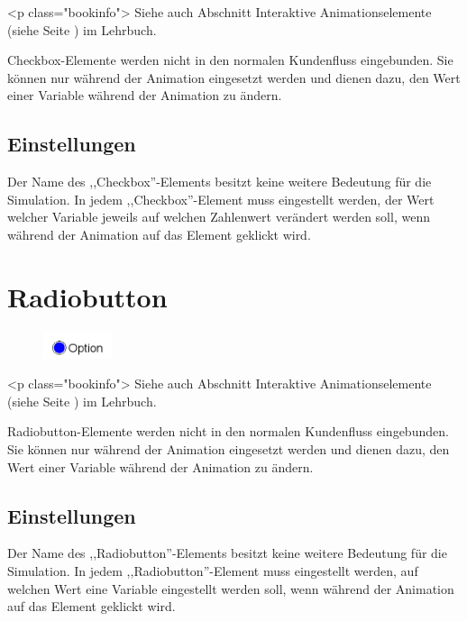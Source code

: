 <p class="bookinfo">
Siehe auch Abschnitt Interaktive Animationselemente (siehe Seite \pageref{ref:book:8.12.4}) im Lehrbuch.

Checkbox-Elemente werden nicht in den normalen Kundenfluss eingebunden.
Sie können nur während der Animation eingesetzt werden und dienen dazu,
den Wert einer Variable während der Animation zu ändern.

\subsection*{Einstellungen}

Der Name des ,,Checkbox''-Elements besitzt keine weitere Bedeutung für die Simulation.
In jedem ,,Checkbox''-Element muss eingestellt werden, der Wert welcher Variable
jeweils auf welchen Zahlenwert verändert werden soll, wenn während der Animation
auf das Element geklickt wird.


\section{Radiobutton}
\label{ref:ModelElementInteractiveRadiobutton}

\begin{figure}
\vspace{-22pt}
\includegraphics[width=2cm]{imageModelElementInteractiveRadiobutton.png}
\vspace{-22pt}
\end{figure}

<p class="bookinfo">
Siehe auch Abschnitt Interaktive Animationselemente (siehe Seite \pageref{ref:book:8.12.4}) im Lehrbuch.

Radiobutton-Elemente werden nicht in den normalen Kundenfluss eingebunden.
Sie können nur während der Animation eingesetzt werden und dienen dazu,
den Wert einer Variable während der Animation zu ändern.

\subsection*{Einstellungen}

Der Name des ,,Radiobutton''-Elements besitzt keine weitere Bedeutung für die Simulation.
In jedem ,,Radiobutton''-Element muss eingestellt werden, auf welchen Wert eine Variable
eingestellt werden soll, wenn während der Animation auf das Element geklickt wird.


